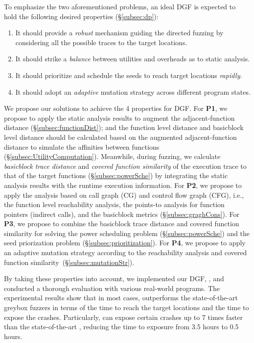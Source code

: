To emphasize the two aforementioned problems, an ideal DGF is expected to hold the following desired properties (\S\ref{subsec:dp}):
\begin{enumerate}[\textbf{P}1]
\itemsep0em 
\item It should provide a \emph{robust} mechanism guiding the directed fuzzing by considering all the possible traces to the target locations.
\item It should strike a \emph{balance} between utilities and overheads as to static analysis.
\item It should prioritize and schedule the seeds to reach target locations \emph{rapidly}.
\item It should adopt an \emph{adaptive} mutation strategy across different program states.
\end{enumerate}


We propose our solutions to achieve the 4 properties for DGF. 
For \textbf{P1}, we propose to apply the static analysis results to augment the adjacent-function distance (\S\ref{subsec:functionDist}); and the function level distance and basicblock level distance should be calculated based on the augmented adjacent-function distance to simulate the affinities between functions (\S\ref{subsec:UtilityComputation}).
Meanwhile, during fuzzing, we calculate \emph{basicblock trace distance} and \emph{covered function similarity} of the execution trace to that of the target functions (\S\ref{subsec:powerSche}) by integrating the static analysis results with the runtime execution information.
For \textbf{P2}, we propose to apply the analysis based on call graph (CG) and control flow graph (CFG), i.e., the function level reachability analysis, the points-to analysis for function pointers (indirect calls), and the basicblock metrics (\S\ref{subsec:graghCons}). 
For \textbf{P3}, we propose to combine the basicblock trace distance and covered function similarity for solving the power scheduling problem (\S\ref{subsec:powerSche}) and the seed priorization problem (\S\ref{subsec:prioritization}). 
For \textbf{P4}, we propose to apply an adaptive mutation strategy according to the reachability analysis and covered function similarity~(\S\ref{subsec:mutationStr}).

By taking these properties into account, we implemented our DGF, {\dFOT}, and conducted a thorough evaluation with various real-world programs. 
The experimental results show that in most cases, {\dFOT} outperforms the state-of-the-art greybox fuzzers in terms of the time to reach the target locations and the time to expose the crashes.
Particularly, {\dFOT} can expose certain crashes up to 7 times faster than the state-of-the-art \aflgo, reducing the time to exposure from 3.5 hours to 0.5 hours.

